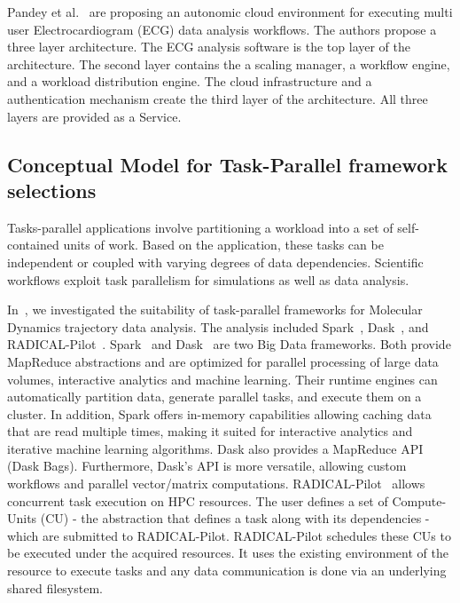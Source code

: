 Pandey et al.~\cite{pandey2012autonomic} are proposing an autonomic cloud 
environment for executing multi user Electrocardiogram (ECG) data analysis 
workflows. The authors propose a three layer architecture. The ECG analysis 
software is the top layer of the architecture. The second layer contains the a 
scaling manager, a workflow engine, and a workload distribution engine. The cloud 
infrastructure and a authentication mechanism create the third layer of the 
architecture. All three layers are provided as a Service.  

\subsection{Conceptual Model for Task-Parallel framework selections}
Tasks-parallel applications involve partitioning a workload into a set of 
self-contained units of work. Based on the application, these tasks can be 
independent or coupled with varying degrees of data dependencies. Scientific 
workflows exploit task parallelism for simulations as well as data analysis.

In~\cite{paraskevakos2018task}, we investigated the suitability of task-parallel 
frameworks for Molecular Dynamics trajectory data analysis. The analysis included 
Spark~\cite{zaharia2010spark}, Dask~\cite{rocklin2015dask}, and RADICAL-Pilot~\cite{merzky2019using}. 
Spark~\cite{zaharia2010spark} and Dask~\cite{rocklin2015dask} are two Big Data 
frameworks. Both provide MapReduce abstractions and are optimized for parallel 
processing of large data volumes, interactive analytics and machine learning. Their 
runtime engines can automatically partition data, generate parallel tasks, and 
execute them on a cluster. In addition, Spark offers in-memory capabilities allowing 
caching data that are read multiple times, making it suited for interactive 
analytics and iterative machine learning algorithms. Dask also provides a MapReduce 
API (Dask Bags). Furthermore, Dask’s API is more versatile, allowing custom 
workflows and parallel vector/matrix computations. RADICAL-Pilot~\cite{merzky2019using} 
allows concurrent task execution on HPC resources. The user defines a set of 
Compute-Units (CU) - the abstraction that defines a task along with its dependencies - 
which are submitted to RADICAL-Pilot. RADICAL-Pilot schedules these CUs to be 
executed under the acquired resources. It uses the existing environment of the 
resource to execute tasks and any data communication is done via an underlying 
shared filesystem.

